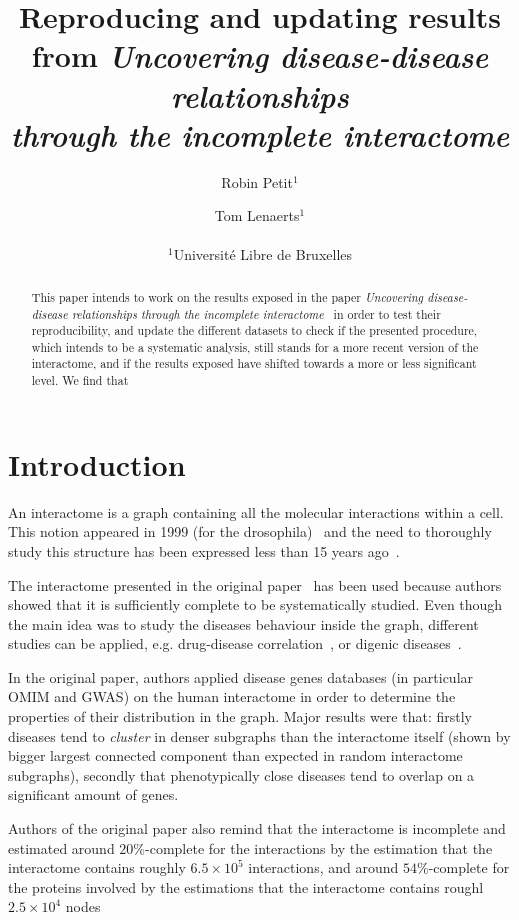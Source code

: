 \documentclass[letterpaper]{article}
\title{Reproducing and updating results from
\textit{Uncovering disease-disease relationships\\through the incomplete interactome}}
\author{Robin Petit$^{1}$ \and Tom Lenaerts$^{1}$\\
\mbox{}\\
$^1$Université Libre de Bruxelles}
\begin{document}
\maketitle

\begin{abstract}
  This paper intends to work on the results exposed in the paper \textit{Uncovering
	disease-disease relationships through the incomplete interactome}~\citep{originalPaper}
	in order to test their reproducibility, and update the different datasets to check if the
	presented procedure, which intends to be a systematic analysis, still stands for a more
	recent version of the interactome, and if the results exposed have shifted towards a more
	or less significant level. We find that
\end{abstract}

\section{Introduction}
An interactome is a graph containing all the molecular interactions within a cell. This notion appeared
in 1999 (for the drosophila)~\citep{sanchez1999grasping} and the need to thoroughly study this structure has
been expressed less than 15 years ago~\citep{UnderstandingTheCellFunctionalOrganization}.

The interactome presented in the original paper~\citep{originalPaper} has been used because authors showed that it is
sufficiently complete to be systematically studied. Even though the main idea was to study the diseases
behaviour inside the graph, different studies can be applied, e.g. drug-disease correlation~\citep{Yu2016extraction},
or digenic diseases~\citep{gazzo2015dida}.

In the original paper, authors applied disease genes databases (in particular OMIM and GWAS) on
the human interactome in order to determine the properties of their distribution in the graph.
Major results were that: firstly diseases tend to \textit{cluster} in denser subgraphs than the
interactome itself (shown by bigger largest connected component than expected in random interactome subgraphs),
secondly that phenotypically close diseases tend to overlap on a significant amount of genes.

Authors of the original paper also remind that the interactome is incomplete and estimated around $20\%$-complete
for the interactions by the estimation that the interactome contains roughly $6.5 \times 10^5$ interactions,
and around $54\%$-complete for the proteins involved by the estimations that the interactome contains roughl
$2.5 \times 10^4$ nodes~\citep{ATruerMeasureOfOurIgnorance,estimatingTheSizeOfTheHumanInteractome}
\end{document}
